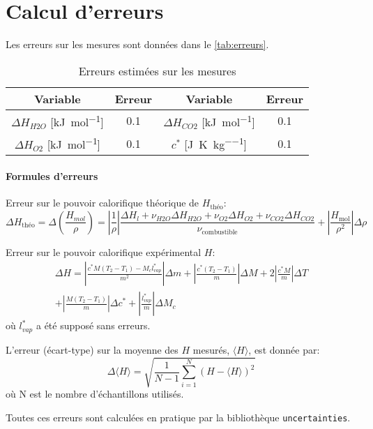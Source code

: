 \section{Calcul d'erreurs}
\label{sec:erreurs}

Les erreurs sur les mesures sont données dans le \autoref{tab:erreurs}.

\begin{table}[h]
    \centering
    \begin{tabulary}{\textwidth}{C C|C C}
        \toprule
        Variable & Erreur & Variable & Erreur \\
        \midrule
        \(\Delta H_{H2O}\) [\si{\kilo\joule\per\mole}] & 0.1 & \(\Delta H_{CO2}\) [\si{\kilo\joule\per\mole}] & 0.1 \\
        \(\Delta H_{O2}\) [\si{\kilo\joule\per\mole}] & 0.1 & \(c^*\) [\si{\joule\per\kelvin\per\kilo\gram}] & 0.1 \\
        \bottomrule
    \end{tabulary}
    \caption{Erreurs estimées sur les mesures}
    \label{tab:erreurs}
\end{table}


\paragraph*{Formules d'erreurs}

Erreur sur le pouvoir calorifique théorique de \(H_\textrm{théo}\):
\begin{equation}
    \Delta H_\textrm{théo} = \Delta(\frac{H_{mol}}{\rho}) = \left|\frac{1}{\rho}\right| \frac{\Delta H_{l} + \nu_{H2O} \Delta H_{H2O} + \nu_{O2} \Delta H_{O2} + \nu_{CO2} \Delta H_{CO2}}{\nu_\textrm{combustible}} + \left|\frac{H_\textrm{mol}}{\rho^2}\right| \Delta\rho
\end{equation}

Erreur sur le pouvoir calorifique expérimental \(H\):
\begin{multline}
    \Delta H = \left|\frac{c^* M (T_2 - T_1) - M_c l^*_{vap}}{m^2}\right| \Delta m + \left|\frac{c^* (T_2 - T_1)}{m}\right| \Delta M + 2 \left|\frac{c^* M}{m}\right| \Delta T \\+ \left|\frac{M (T_2 - T_1)}{m}\right| \Delta c^* + \left|\frac{l^*_{vap}}{m}\right| \Delta M_c
\end{multline}
où \(l^*_{vap}\) a été supposé sans erreurs.

L'erreur (écart-type) sur la moyenne des \(H\) mesurés, \(\langle H \rangle\), est donnée par:
\begin{equation}
    \Delta \langle H \rangle = \sqrt{\frac{1}{N - 1}\sum_{i=1}^{N}(H - \langle H \rangle)^2}
\end{equation}
où N est le nombre d'échantillons utilisés.

Toutes ces erreurs sont calculées en pratique par la bibliothèque \texttt{uncertainties}.
